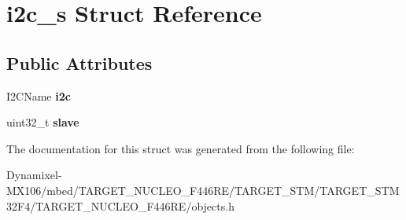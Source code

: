 \hypertarget{structi2c__s}{}\section{i2c\+\_\+s Struct Reference}
\label{structi2c__s}
\subsection*{Public Attributes}
\begin{DoxyCompactItemize}
\item 
I2\+C\+Name {\bfseries i2c}\hypertarget{structi2c__s_a4a88c7abf18a2bd889b7ed9c05c359ac}{}\label{structi2c__s_a4a88c7abf18a2bd889b7ed9c05c359ac}

\item 
uint32\+\_\+t {\bfseries slave}\hypertarget{structi2c__s_a15f264f3816442598a2ddae4a03f34d1}{}\label{structi2c__s_a15f264f3816442598a2ddae4a03f34d1}

\end{DoxyCompactItemize}


The documentation for this struct was generated from the following file\+:\begin{DoxyCompactItemize}
\item 
Dynamixel-\/\+M\+X106/mbed/\+T\+A\+R\+G\+E\+T\+\_\+\+N\+U\+C\+L\+E\+O\+\_\+\+F446\+R\+E/\+T\+A\+R\+G\+E\+T\+\_\+\+S\+T\+M/\+T\+A\+R\+G\+E\+T\+\_\+\+S\+T\+M32\+F4/\+T\+A\+R\+G\+E\+T\+\_\+\+N\+U\+C\+L\+E\+O\+\_\+\+F446\+R\+E/objects.\+h\end{DoxyCompactItemize}
